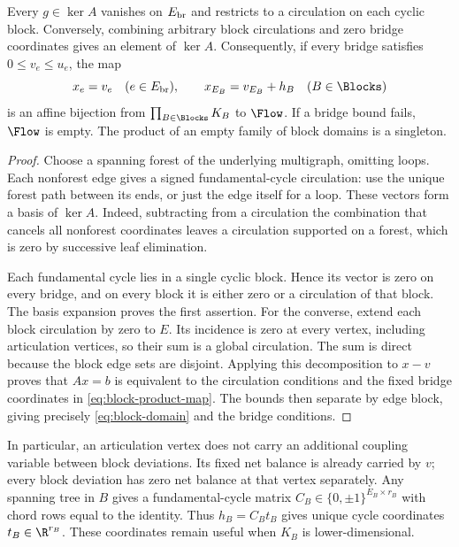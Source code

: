\begin{lemma}\label{lem:block-factorization}
Every $g\in\ker A$ vanishes on $E_{\rm br}$ and restricts to a circulation
on each cyclic block. Conversely, combining arbitrary block circulations
and zero bridge coordinates gives an element of $\ker A$. Consequently,
if every bridge satisfies $0\le v_e\le u_e$, the map
\begin{equation}\label{eq:block-product-map}
 x_e=v_e\quad(e\in E_{\rm br}),\qquad
 x_{E_B}=v_{E_B}+h_B\quad(B\in\Blocks)
\end{equation}
is an affine bijection from $\prod_{B\in\Blocks}K_B$ to $\Flow$.
If a bridge bound fails, $\Flow$ is empty. The product of an empty family
of block domains is a singleton.
\end{lemma}
\begin{proof}
Choose a spanning forest of the underlying multigraph, omitting loops. Each
nonforest edge gives a signed fundamental-cycle circulation: use the unique
forest path between its ends, or just the edge itself for a loop. These
vectors form a basis of $\ker A$. Indeed, subtracting from a circulation
the combination that cancels all nonforest coordinates leaves a circulation
supported on a forest, which is zero by successive leaf elimination.

Each fundamental cycle lies in a single cyclic block. Hence its vector is
zero on every bridge, and on every block it is either zero or a circulation
of that block. The basis expansion proves the first assertion. For the
converse, extend each block circulation by zero to $E$. Its incidence is
zero at every vertex, including articulation vertices, so their sum is a
global circulation. The sum is direct because the block edge sets are
disjoint. Applying this decomposition to $x-v$ proves that $Ax=b$ is
equivalent to the circulation conditions and the fixed bridge coordinates
in \eqref{eq:block-product-map}. The bounds then separate by edge block,
giving precisely \eqref{eq:block-domain} and the bridge conditions.
\end{proof}

In particular, an articulation vertex does not carry an additional coupling
variable between block deviations. Its fixed net balance is already carried
by $v$; every block deviation has zero net balance at that vertex separately.
Any spanning tree in $B$ gives a fundamental-cycle matrix
$C_B\in\{0,\pm1\}^{E_B\times r_B}$ with chord rows equal to the identity.
Thus $h_B=C_Bt_B$ gives unique cycle coordinates $t_B\in\R^{r_B}$.
These coordinates remain useful when $K_B$ is lower-dimensional.

